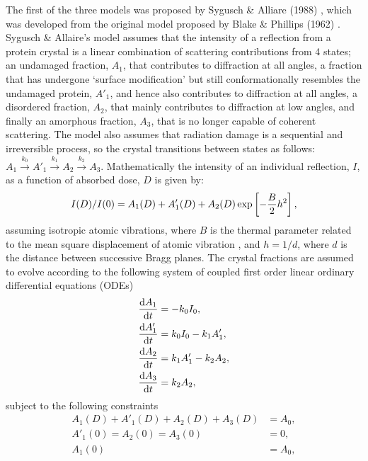 The first of the three models was proposed by Sygusch \& Alliare (1988) \cite{sygusch1988}, which was developed from the original model proposed by Blake \& Phillips (1962) \cite{blake1962}.
Sygusch \& Allaire's model assumes that the intensity of a reflection from a protein crystal is a linear combination of scattering contributions from 4 states; an undamaged fraction, $A_1$, that contributes to diffraction at all angles, a fraction that has undergone `surface modification' but still conformationally resembles the undamaged protein, $A'_1$, and hence also contributes to diffraction at all angles, a disordered fraction, $A_2$, that mainly contributes to diffraction at low angles, and finally an amorphous fraction, $A_3$, that is no longer capable of coherent scattering.
The model also assumes that radiation damage is a sequential and irreversible process, so the crystal transitions between states as follows: $A_1 \xrightarrow{k_0} A'_1 \xrightarrow{k_1} A_2 \xrightarrow{k_2} A_3$.
Mathematically the intensity of an individual reflection, $I$, as a function of absorbed dose, $D$ is given by:
\begin{equation}
I(D)/I(0) = A_1(D) + A'_1(D) + A_2(D) \exp \left[ -\frac{B}{2}h^2\right],
\label{eq: Sygusch and Allaire DDM}
\end{equation}
assuming isotropic atomic vibrations, where $B$ is the thermal parameter related to the mean square displacement of atomic vibration \cite{drenth1999}, and $h = 1/d$, where $d$ is the distance between successive Bragg planes.
\newline
The crystal fractions are assumed to evolve according to the following system of coupled first order linear ordinary differential equations (ODEs)
\begin{subequations}
\begin{align}
\frac{\mathrm{d}A_1}{\mathrm{d}t}  &= - k_0 I_0,                        \\
\frac{\mathrm{d}A'_1}{\mathrm{d}t} &=   k_0 I_0  - k_1 A'_1,            \\
\frac{\mathrm{d}A_2}{\mathrm{d}t}  &=              k_1 A'_1  - k_2 A_2, \\
\frac{\mathrm{d}A_3}{\mathrm{d}t}  &=                          k_2 A_2,
\end{align}
\label{eq:ODE system Syg and All}
\end{subequations}
subject to the following constraints
\begin{subequations}
\begin{align}
A_1(D) + A'_1(D) + A_2(D) + A_3(D) &= A_0, \\
A'_1(0) = A_2(0) = A_3(0)          &= 0,   \\
A_1(0)                             &= A_0,
\end{align}
\label{eq: ODE constraints Syg and All}
\end{subequations}
